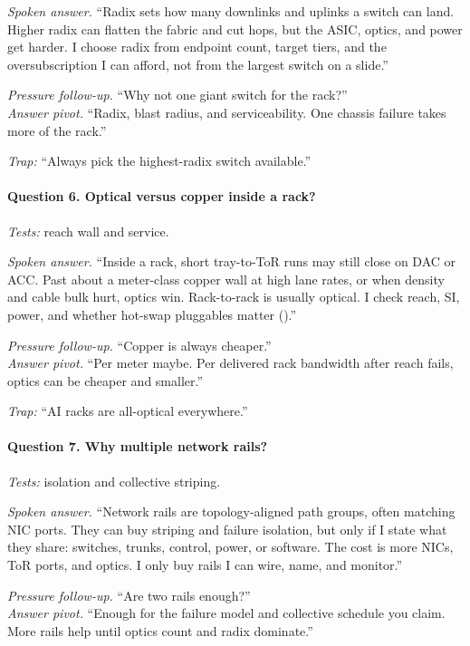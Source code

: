 \textit{Spoken answer.}
``Radix sets how many downlinks and uplinks a switch can land. Higher radix can
flatten the fabric and cut hops, but the ASIC, optics, and power get harder.
I choose radix from endpoint count, target tiers, and the oversubscription I
can afford, not from the largest switch on a slide.''

\textit{Pressure follow-up.} ``Why not one giant switch for the rack?''\\
\textit{Answer pivot.} ``Radix, blast radius, and serviceability. One chassis
failure takes more of the rack.''

\textit{Trap:} ``Always pick the highest-radix switch available.''

\paragraph{Question 6. Optical versus copper inside a rack?}
\textit{Tests:} reach wall and service.

\textit{Spoken answer.}
``Inside a rack, short tray-to-ToR runs may still close on DAC or ACC. Past
about a meter-class copper wall at high lane rates, or when density and cable
bulk hurt, optics win. Rack-to-rack is usually optical. I check reach, SI,
power, and whether hot-swap pluggables matter
().''

\textit{Pressure follow-up.} ``Copper is always cheaper.''\\
\textit{Answer pivot.} ``Per meter maybe. Per delivered rack bandwidth after
reach fails, optics can be cheaper and smaller.''

\textit{Trap:} ``AI racks are all-optical everywhere.''

\paragraph{Question 7. Why multiple network rails?}
\textit{Tests:} isolation and collective striping.

\textit{Spoken answer.}
``Network rails are topology-aligned path groups, often matching NIC ports.
They can buy striping and failure isolation, but only if I state what they
share: switches, trunks, control, power, or software. The cost is more NICs,
ToR ports, and optics. I only buy rails I can wire, name, and monitor.''

\textit{Pressure follow-up.} ``Are two rails enough?''\\
\textit{Answer pivot.} ``Enough for the failure model and collective schedule
you claim. More rails help until optics count and radix dominate.''

